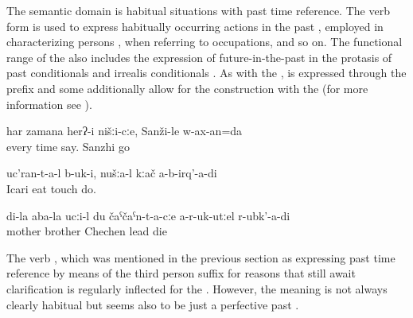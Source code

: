The semantic domain is habitual situations with past time reference. The verb form is used to express habitually occurring actions in the past , employed in characterizing persons , when referring to occupations, and so on. The functional range of the  also includes the expression of future-in-the-past in the protasis of past conditionals and irrealis conditionals . As with the ,  is expressed through the prefix   and some  additionally allow for the  construction with the  (for more information see ).
%
\begin{exe}
	\ex	\label{ex:He always told us}
	\gll	har	zamana	herʔ-i	nišːi-cːe,	Sanži-le	w-ax-an=da\\
		every	time	say.		Sanzhi	go\\
	\glt	{}

	\ex	\label{ex:Icari people ate it}
	\gll	uc'ran-t-a-l	b-uk-i,	nušːa-l	kːač	a-b-irq'-a-di\\
		Icari	eat		touch	do.\\
	\glt	{}

	\ex	\label{ex:If my mother's brother would not have brought me to Chechnya}
	\gll	di-la	aba-la	ucːi-l	du	čaˁčaˁn-t-a-cːe	a-r-uk-utːel		r-ubk'-a-di\\
			mother	brother		Chechen	lead	die\\
	\glt	{}

\end{exe}


The verb  , which was mentioned in the previous section as expressing past time reference by means of the third person  suffix for reasons that still await clarification is regularly inflected for the . However, the meaning is not always clearly habitual but seems also to be just a perfective past .

